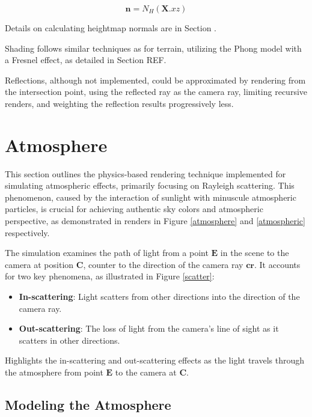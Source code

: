 \begin{equation}
\mathbf{n}= N_{H}(\mathbf{X}.xz)
\end{equation}

Details on calculating heightmap normals are in Section .

Shading follows similar techniques as for terrain, utilizing the Phong model with a Fresnel effect, as detailed in Section REF. 

Reflections, although not implemented, could be approximated by rendering from the intersection point, using the reflected ray as the camera ray, limiting recursive renders, and weighting the reflection results progressively less. 

\section{Atmosphere}

This section outlines the physics-based rendering technique implemented for simulating atmospheric effects, primarily focusing on Rayleigh scattering. This phenomenon, caused by the interaction of sunlight with minuscule atmospheric particles, is crucial for achieving authentic sky colors and atmospheric perspective, as demonstrated in renders in Figure \ref{atmosphere}  and \ref{atmospheric} respectively.

The simulation examines the path of light from a point $\mathbf{E}$ in the scene to the camera at position $\mathbf{C}$, counter to the direction of the camera ray $\mathbf{cr}$. It accounts for two key phenomena, as illustrated in Figure \ref{scatter}:
\begin{itemize}
    \item \textbf{In-scattering}: Light scatters from other directions into the direction of the camera ray.
    \item \textbf{Out-scattering}: The loss of light from the camera's line of sight as it scatters in other directions.
\end{itemize}

{Highlights the in-scattering and out-scattering effects as the light travels through the atmosphere from point $\mathbf{E}$ to the camera at $\mathbf{C}$.}


\subsection{Modeling the Atmosphere}

